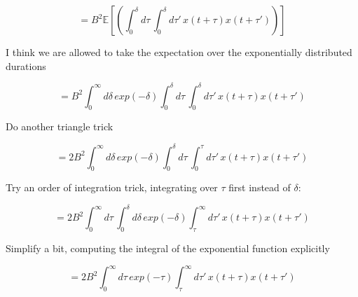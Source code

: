 \documentclass[12pt]{article}
\begin{document}
$$ = B^2 \mathbb{E}\left[\left(
  \int_{0}^{\delta}{d\tau\,\int_{0}^{\delta}{d\tau'\, x(t+\tau) x(t+\tau')}}\right)
  \right]$$

I think we are allowed to take the expectation over the exponentially distributed durations

$$= B^2 \int_{0}^{\infty}{d\delta\, exp(-\delta)\int_{0}^{\delta}{d\tau\,\int_{0}^{\delta}{d\tau'\, x(t+\tau) x(t+\tau')}}}$$

Do another triangle trick

$$= 2B^2 \int_{0}^{\infty}{d\delta\, exp(-\delta)\int_{0}^{\delta}{d\tau\,\int_{0}^{\tau}{d\tau'\, x(t+\tau) x(t+\tau')}}}$$

Try an order of integration trick, integrating over $\tau$ first instead of $\delta$:

$$= 2B^2 \int_{0}^{\infty}{
  d\tau\, \int_{0}^{\delta}{
  d\delta\,exp(-\delta) \int_{\tau}^{\infty}{
  d\tau'\, x(t+\tau) x(t+\tau')}}}$$

Simplify a bit, computing the integral of the exponential function explicitly

$$= 2B^2 \int_{0}^{\infty}{
  d\tau\, exp(-\tau) \int_{\tau}^{\infty}{
  d\tau'\, x(t+\tau) x(t+\tau')}}$$
\end{document}
